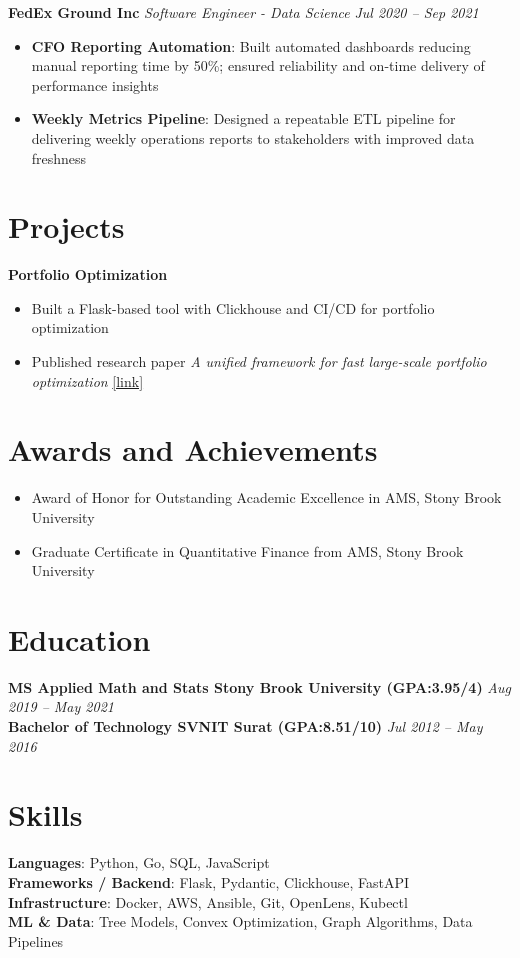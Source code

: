 \documentclass[letterpaper,10pt]{article}
\begin{document}
\textbf{{FedEx Ground Inc}} \textit{{Software Engineer - Data Science}} \hfill \textit{{Jul 2020 -- Sep 2021}}
\begin{itemize}
    \item \textbf{{CFO Reporting Automation}}: Built automated dashboards reducing manual reporting time by 50\%; ensured reliability and on-time delivery of performance insights
    \item \textbf{{Weekly Metrics Pipeline}}: Designed a repeatable ETL pipeline for delivering weekly operations reports to stakeholders with improved data freshness
\end{itemize}
\section*{Projects}
\textbf{{Portfolio Optimization}}
\begin{itemize}
    \item Built a Flask-based tool with Clickhouse and CI/CD for portfolio optimization
    \item Published research paper \textit{{A unified framework for fast large-scale portfolio optimization}} \href{{https://arxiv.org/abs/2303.12751}}{{[link]}}
\end{itemize}
\section*{ Awards and Achievements}
\begin{itemize}
    \item Award of Honor for Outstanding Academic Excellence in AMS, Stony Brook University
    \item Graduate Certificate in Quantitative Finance from AMS, Stony Brook University
\end{itemize}
\section*{Education}
\textbf{{MS Applied Math and Stats Stony Brook University (GPA:3.95/4)}} \hfill \textit{{Aug 2019 -- May 2021}} \\
\textbf{{Bachelor of Technology SVNIT Surat (GPA:8.51/10)}} \hfill \textit{{Jul 2012 -- May 2016}} 
\section*{Skills}
\textbf{{Languages}}: Python, Go, SQL, JavaScript\\
\textbf{{Frameworks / Backend}}: Flask, Pydantic, Clickhouse, FastAPI\\
\textbf{{Infrastructure}}: Docker, AWS, Ansible, Git, OpenLens, Kubectl\\
\textbf{{ML \& Data}}: Tree Models, Convex Optimization, Graph Algorithms, Data Pipelines
\end{document}
